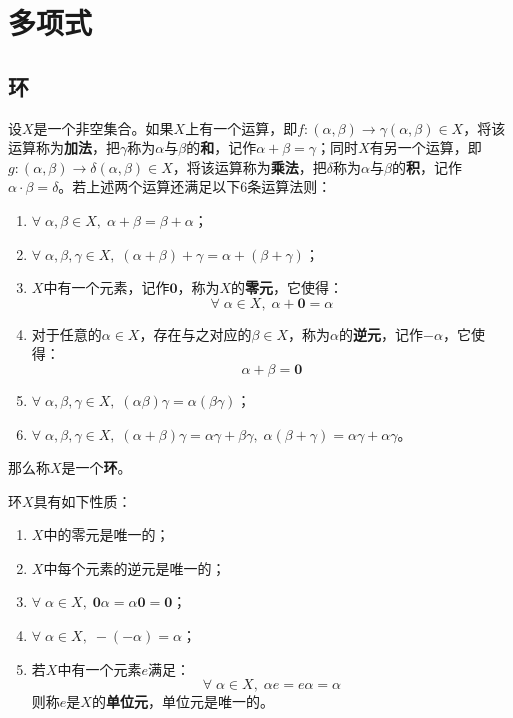 \section{多项式}

\subsection{环}
\begin{definition}
	设$X$是一个非空集合。如果$X$上有一个运算，即$f:(\alpha,\beta)\rightarrow\gamma(\alpha,\beta)\in X$，将该运算称为\textbf{加法}，把$\gamma$称为$\alpha$与$\beta$的\textbf{和}，记作$\alpha+\beta=\gamma$；同时$X$有另一个运算，即$g:(\alpha,\beta)\rightarrow\delta(\alpha,\beta)\in X$，将该运算称为\textbf{乘法}，把$\delta$称为$\alpha$与$\beta$的\textbf{积}，记作$\alpha\cdot\beta=\delta$。若上述两个运算还满足以下$6$条运算法则：
	\begin{enumerate}
		\item $\forall\;\alpha,\beta\in X,\;\alpha+\beta=\beta+\alpha$；
		\item $\forall\;\alpha,\beta,\gamma\in X,\;(\alpha+\beta)+\gamma=\alpha+(\beta+\gamma)$；
		\item $X$中有一个元素，记作$\mathbf{0}$，称为$X$的\textbf{零元}，它使得：
		\begin{equation*}
			\forall\;\alpha\in X,\;\alpha+\mathbf{0}=\alpha
		\end{equation*}
		\item 对于任意的$\alpha\in X$，存在与之对应的$\beta\in X$，称为$\alpha$的\textbf{逆元}，记作$-\alpha$，它使得：
		\begin{equation*}
			\alpha+\beta=\mathbf{0}
		\end{equation*}
		\item $\forall\;\alpha,\beta,\gamma\in X,\;(\alpha\beta)\gamma=\alpha(\beta\gamma)$；
		\item $\forall\;\alpha,\beta,\gamma\in X,\;(\alpha+\beta)\gamma=\alpha\gamma+\beta\gamma,\;\alpha(\beta+\gamma)=\alpha\gamma+\alpha\gamma$。
	\end{enumerate}
	那么称$X$是一个\textbf{环}。
\end{definition}
\begin{property}\label{prop:RingAlgebra}
	环$X$具有如下性质：
	\begin{enumerate}
		\item $X$中的零元是唯一的；
		\item $X$中每个元素的逆元是唯一的；
		\item $\forall\;\alpha\in X,\;\mathbf{0}\alpha=\alpha\mathbf{0}=\mathbf{0}$；
		\item $\forall\;\alpha\in X,\;-(-\alpha)=\alpha$；
		\item 若$X$中有一个元素$e$满足：
		\begin{equation*}
			\forall\;\alpha\in X,\;\alpha e=e\alpha=\alpha
		\end{equation*}
		则称$e$是$X$的\textbf{单位元}，单位元是唯一的。
	\end{enumerate}
\end{property}
